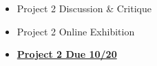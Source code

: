 \def\tues{10/20}%
\def\thur{10/22}%
% 
\begin{itemize}[noitemsep,topsep=0pt,leftmargin=*]
    \item Project 2 Discussion \& Critique
    \item Project 2 Online Exhibition
\end{itemize}
\begin{itemize}[noitemsep,topsep=0pt,leftmargin=*]
    \item \textcolor{defaultColor}{\ul{\textbf{Project 2 Due \tues}}}
\end{itemize}